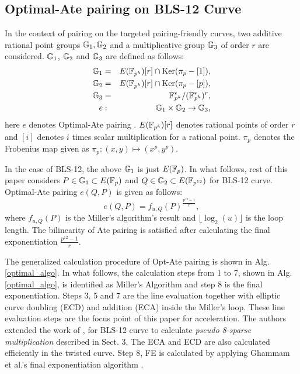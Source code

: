 \subsection{Optimal-Ate pairing on BLS-12 Curve}
In the context of pairing on the targeted pairing-friendly curves, two additive rational point groups ${\mathbb{G}}_{1}, {\mathbb{G}}_{2}$ and a multiplicative group ${\mathbb{G}}_{3}$ of order $r$ are considered. 
${\mathbb{G}}_{1}$, ${\mathbb{G}}_{2}$ and ${\mathbb{G}}_{3}$ are defined as follows:
\begin{eqnarray}\label{eq:g1}
{\mathbb{G}}_{1} & = &  E({\mathbb{F}}_{p^{k}}) [r] \cap \text{Ker}(\pi_p - [1]), \nonumber \\
{\mathbb{G}}_{2} & = &  E({\mathbb{F}}_{p^{k}}) [r] \cap \text{Ker}(\pi_p - [p]), \nonumber \\
{\mathbb{G}}_{3} & = & {{\mathbb{F}}^{\ast}}_{\!\!\!p^{k}}/({{\mathbb{F}}^{\ast}}_{\!\!\!p^{k}})^r, \nonumber \\
 e & : &{\mathbb{G}}_{1} \times {\mathbb{G}}_{2} \rightarrow {\mathbb{G}}_{3},
\end{eqnarray}
here $e$ denotes Optimal-Ate pairing \cite{op_ate_p}. $E({\mathbb{F}}_{p^{k}})[r]$ denotes rational points of order $r$ and $[i]$ denotes $i$ times scalar multiplication for a rational point. 
$\pi_p$ denotes the Frobenius map given as $\pi_p: (x,y) \mapsto (x^p,y^p)$.

In the case of BLS-12, the above ${\mathbb{G}}_{1}$ is just $E(\mathbb{F}_p)$. 
In what follows, rest of this paper considers $P \in {\mathbb{G}}_{1} \subset E(\mathbb{F}_p)$ and  $Q \in {\mathbb{G}}_{2} \subset  E(\mathbb{F}_{p^{12}})$ for BLS-12 curve.
Optimal-Ate pairing $e(Q,P)$ is given as follows:
\begin{equation}
	e(Q,P)=f_{u,Q}(P)^{\frac{p^{12}-1}{r}},
\end{equation}
where $f_{u,Q}(P)$ is the Miller's algorithm's result and $\lfloor \log_2 (u) \rfloor$ is the loop length. The bilinearity of Ate pairing is satisfied after calculating the final exponentiation $\frac{p^{12}-1}{r}$.


The generalized calculation procedure of Opt-Ate pairing is shown in Alg. \ref{optimal_algo}. 
In what follows, the calculation steps from 1 to 7, shown in Alg. \ref{optimal_algo}, is identified as Miller's Algorithm and step 8 is the final exponentiation. Steps 3, 5 and 7 are the line evaluation together with elliptic curve doubling (ECD) and addition (ECA) inside the Miller's loop. These line evaluation steps are the focus point of this paper for acceleration. 
The authors extended the work of \cite{mori},\cite{self_ICISC} for BLS-12 curve to calculate \textit{pseudo 8-sparse multiplication} described in Sect. 3.
The ECA and ECD are also calculated efficiently in the twisted curve. 
Step 8, FE is calculated by applying Ghammam et al.'s final exponentiation algorithm \cite{loubna_bls12}.

